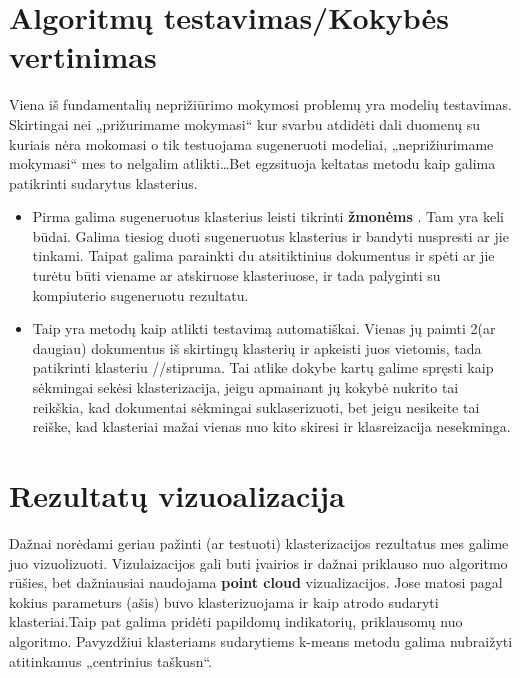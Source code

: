 \documentclass[draft]{VUMIFInfKursinis}
\begin{document}
\section{Algoritmų testavimas/Kokybės vertinimas}
Viena iš fundamentalių neprižiūrimo mokymosi problemų yra modelių testavimas. Skirtingai nei „prižurimame mokymasi“ kur svarbu atdidėti dali duomenų su kuriais nėra mokomasi o tik testuojama sugeneruoti modeliai, „neprižiurimame mokymasi“ mes to nelgalim atlikti\ldots Bet egzsituoja keltatas metodu kaip galima patikrinti sudarytus klasterius.
\begin{itemize}
	\item Pirma galima sugeneruotus klasterius leisti tikrinti \textbf{žmonėms }. Tam yra keli būdai. Galima tiesiog duoti sugeneruotus klasterius ir bandyti nuspresti ar jie tinkami. Taipat galima parainkti du atsitiktinius dokumentus ir spėti ar jie turėtu būti viename ar atskiruose klasteriuose, ir tada palyginti su kompiuterio sugeneruotu rezultatu. 
	\item Taip yra metodų kaip atlikti testavimą automatiškai. Vienas jų paimti 2(ar daugiau) dokumentus iš skirtingų klasterių ir apkeisti juos vietomis, tada patikrinti klasteriu //stipruma. Tai atlike dokybe kartų galime spręsti kaip sėkmingai sekėsi klasterizacija, jeigu apmainant jų kokybė nukrito tai reikškia, kad dokumentai sėkmingai suklaserizuoti, bet jeigu nesikeite tai reiške, kad klasteriai mažai vienas nuo kito skiresi ir klasreizacija nesekminga.
\end{itemize}

\section{Rezultatų vizuoalizacija}
Dažnai norėdami geriau pažinti (ar testuoti) klasterizacijos rezultatus mes galime juo vizuolizuoti. Vizulaizacijos gali buti įvairios ir dažnai priklauso nuo algoritmo rūšies, bet dažniausiai naudojama \textbf{point cloud} vizualizacijos. Jose matosi pagal kokius parameturs (ašis) buvo klasterizuojama ir kaip atrodo sudaryti klasteriai.Taip pat galima pridėti papildomų indikatorių, priklausomų nuo algoritmo. Pavyzdžiui klasteriams sudarytiems k-means metodu galima nubraižyti atitinkamus „centrinius taškusn“.


\printbibliography[heading=bibintoc] %

\appendix  %
\end{document}
